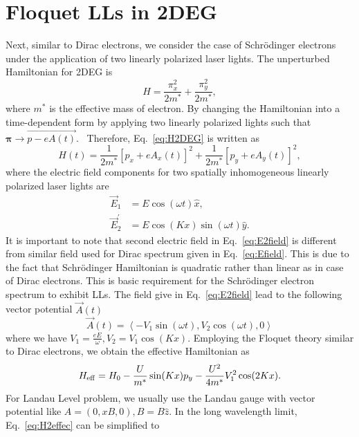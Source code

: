 \section{Floquet LLs in 2DEG}
Next, similar to Dirac electrons, we consider the case of Schr\"{o}dinger electrons under the application of two linearly polarized laser lights. The unperturbed Hamiltonian for 2DEG is%
\begin{equation}\label{eq:H2DEG}
H=\frac{\pi_{x}^{2}}{2m^{\ast}}+\frac{\pi_{y}^{2}}{2m^{\ast}},
\end{equation}
where $m^{\ast}$ is the effective mass of electron. By changing the Hamiltonian into a time-dependent form by applying two linearly polarized lights
such that $\bm{\pi}\rightarrow \vec{p-eA(t)}$. \ Therefore, Eq.~\eqref{eq:H2DEG} is written as%
\begin{equation}\label{eq:H2time}
H(t)=\frac{1}{2m^{\ast}}[p_{x}+eA_{x}(t)]^{2}+\frac{1}{2m^{\ast}}[p_{y}%
+eA_{y}(t)]^{2},
\end{equation}
where the electric field components for two spatially inhomogeneous linearly polarized laser lights are
\begin{align} \label{eq:E2field}
\vec{E}_{1} &=E\cos (\omega t)\hat{x}, \nonumber \\
\vec{E}_{2}^{\prime}&=E\cos(Kx)\sin (\omega t)\hat{y}.
\end{align}%
It is important to note that second electric field in Eq.~\eqref{eq:E2field} is different from similar field used for Dirac spectrum given in Eq.~\eqref{eq:Efield}. This is due to the fact that Schr\"{o}dinger Hamiltonian is quadratic rather than linear as in case of Dirac electrons. This is basic requirement for the Schr\"{o}dinger electron spectrum to exhibit LLs. The field give in Eq.~\eqref{eq:E2field} lead to the following vector potential $\vec{A}(t)$
\begin{equation}\label{eq:A2vector}
\vec{A}(t)= \left\langle -V_1\sin (\omega t), V_2 \cos (\omega t),0 \right\rangle
\end{equation}%
where we have $V_{1}=\frac{eE}{\omega },V_{2}=V_1\cos(Kx)$. Employing the Floquet theory similar to Dirac electrons, we obtain the effective Hamiltonian as%
\begin{equation}\label{eq:H2effec}
	H_{\rm eff}  =H_{0} -\frac{U}{m^{\ast}}\sin (Kx) p_{y} -\frac{U^2}{4m^{\ast}}V_{1}^{2}\cos(2Kx).
\end{equation}
For Landau Level problem, we usually use the Landau gauge with vector potential
like $A=(0,xB,0),B=B\hat{z}$. In the long wavelength limit, Eq.~\eqref{eq:H2effec} can be simplified to
